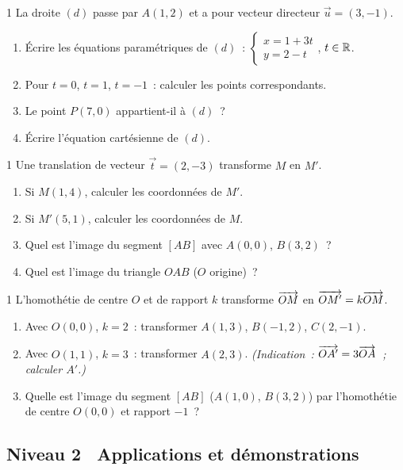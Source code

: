 \begin{exo}{1}
La droite $(d)$ passe par $A(1,2)$ et a pour vecteur directeur $\vec{u}=(3,-1)$.
\begin{enumerate}
  \item \'Ecrire les \'equations param\'etriques de $(d)$~:
        $\begin{cases}x=1+3t\\y=2-t\end{cases}$, $t\in\mathbb{R}$.
  \item Pour $t=0$, $t=1$, $t=-1$~: calculer les points correspondants.
  \item Le point $P(7,0)$ appartient-il \`a $(d)$~?
  \item \'Ecrire l'\'equation cart\'esienne de $(d)$.
\end{enumerate}
\end{exo}

\begin{exo}{1}
Une translation de vecteur $\vec{t}=(2,-3)$ transforme $M$ en $M'$.
\begin{enumerate}
  \item Si $M(1,4)$, calculer les coordonn\'ees de $M'$.
  \item Si $M'(5,1)$, calculer les coordonn\'ees de $M$.
  \item Quel est l'image du segment $[AB]$ avec $A(0,0)$, $B(3,2)$~?
  \item Quel est l'image du triangle $OAB$ ($O$ origine)~?
\end{enumerate}
\end{exo}

\begin{exo}{1}
L'homoth\'etie de centre $O$ et de rapport $k$ transforme $\overrightarrow{OM}$
en $\overrightarrow{OM'} = k\overrightarrow{OM}$.
\begin{enumerate}
  \item Avec $O(0,0)$, $k=2$~: transformer $A(1,3)$, $B(-1,2)$, $C(2,-1)$.
  \item Avec $O(1,1)$, $k=3$~: transformer $A(2,3)$.
        \emph{(Indication~: $\overrightarrow{OA'} = 3\overrightarrow{OA}$~; calculer $A'$.)}
  \item Quelle est l'image du segment $[AB]$ ($A(1,0)$, $B(3,2)$) par
        l'homoth\'etie de centre $O(0,0)$ et rapport $-1$~?
\end{enumerate}
\end{exo}

\subsection*{\quad Niveau 2 \textemdash\ Applications et d\'emonstrations}

